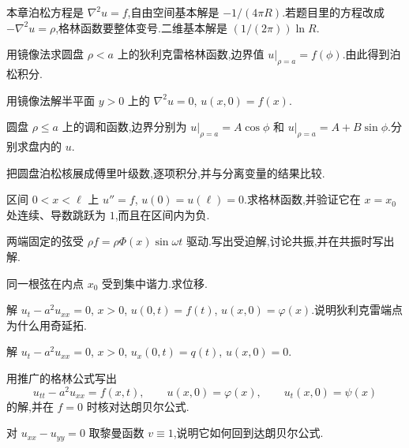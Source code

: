 本章泊松方程是 $\nabla^2 u=f$,自由空间基本解是 $-1/(4\pi R)$.若题目里的方程改成 $-\nabla^2 u=\rho$,格林函数要整体变号.二维基本解是 $(1/(2\pi))\ln R$.

\begin{problemset}
\renewcommand{\theenumi}{\thechapter.\arabic{enumi}}
\renewcommand{\labelenumi}{\theenumi.}
\item 用镜像法求圆盘 $\rho<a$ 上的狄利克雷格林函数,边界值 $u|_{\rho=a}=f(\phi)$.由此得到泊松积分.

\item 用镜像法解半平面 $y>0$ 上的 $\nabla^2 u=0$, $u(x,0)=f(x)$.

\item 圆盘 $\rho\leq a$ 上的调和函数,边界分别为 $u|_{\rho=a}=A\cos\phi$ 和 $u|_{\rho=a}=A+B\sin\phi$.分别求盘内的 $u$.

\item 把圆盘泊松核展成傅里叶级数,逐项积分,并与分离变量的结果比较.

\item 区间 $0<x<\ell$ 上 $u''=f$, $u(0)=u(\ell)=0$.求格林函数,并验证它在 $x=x_0$ 处连续、导数跳跃为 $1$,而且在区间内为负.

\item 两端固定的弦受 $\rho f=\rho\Phi(x)\sin\omega t$ 驱动.写出受迫解,讨论共振,并在共振时写出解.

\item 同一根弦在内点 $x_0$ 受到集中谐力.求位移.

\item 解 $u_t-a^2 u_{xx}=0$, $x>0$, $u(0,t)=f(t)$, $u(x,0)=\varphi(x)$.说明狄利克雷端点为什么用奇延拓.

\item 解 $u_t-a^2 u_{xx}=0$, $x>0$, $u_x(0,t)=q(t)$, $u(x,0)=0$.

\item 用推广的格林公式写出
\begin{equation*}
  u_{tt}-a^2 u_{xx}=f(x,t),
  \qquad
  u(x,0)=\varphi(x),
  \qquad
  u_t(x,0)=\psi(x)
\end{equation*}
的解,并在 $f=0$ 时核对达朗贝尔公式.

\item 对 $u_{xx}-u_{yy}=0$ 取黎曼函数 $v\equiv 1$,说明它如何回到达朗贝尔公式.
\end{problemset}

